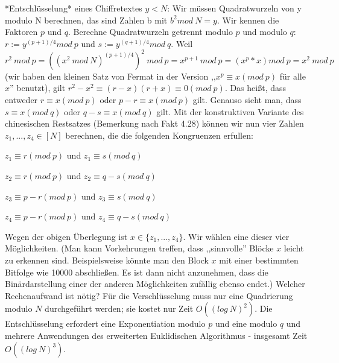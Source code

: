 \documentclass[a4paper]{article}
\begin{document}
\begin{multicols}{3}
        *Entschlüsselung* eines Chiffretextes $y<N$: Wir müssen Quadratwurzeln von y modulo N berechnen, das sind Zahlen b mit $b^2 mod\ N=y$. Wir kennen die Faktoren $p$ und $q$. Berechne Quadratwurzeln getrennt modulo $p$ und modulo $q$: $r:=y^{(p+1)/4} mod\ p$ und $s:=y^{(q+1)/4} mod\ q$.
        Weil $r^2\ mod\ p =((x^2\ mod\ N)^{(p+1)/4})^2\ mod\ p=x^{p+1}\ mod\ p=(x^p *x) mod\ p = x^2\ mod\ p$ (wir haben den kleinen Satz von Fermat in der Version ,,$x^p\equiv x(mod\ p)$ für alle $x$'' benutzt), gilt $r^2-x^2\equiv (r-x)(r+x)\equiv 0 (mod\ p)$. Das heißt, dass entweder $r\equiv x(mod\ p)$ oder $p-r\equiv x(mod\ p)$ gilt.
        Genauso sieht man, dass $s\equiv x(mod\ q)$ oder $q-s\equiv x(mod\ q)$ gilt.
        Mit der konstruktiven Variante des chinesischen Restsatzes (Bemerkung nach Fakt 4.28) können wir nun vier Zahlen $z_1,...,z_4 \in [N]$ berechnen, die die folgenden Kongruenzen erfullen:
        \begin{itemize*}
            \item $z_1 \equiv r (mod\ p)$ und $z_1 \equiv s (mod\ q)$
            \item $z_2 \equiv r (mod\ p)$ und $z_2 \equiv q-s (mod\ q)$
            \item $z_3 \equiv p-r (mod\ p)$ und $z_3 \equiv s (mod\ q)$
            \item $z_4 \equiv p-r (mod\ p)$ und $z_4 \equiv q-s (mod\ q)$
        \end{itemize*}

        Wegen der obigen Überlegung ist $x\in\{z_1,...,z_4\}$. Wir wählen eine dieser vier Möglichkeiten. (Man kann Vorkehrungen treffen, dass ,,sinnvolle'' Blöcke $x$ leicht zu erkennen sind. Beispielsweise könnte man den Block $x$ mit einer bestimmten Bitfolge wie 10000 abschließen. Es ist dann nicht anzunehmen, dass die Binärdarstellung einer der anderen Möglichkeiten zufällig ebenso endet.)
        Welcher Rechenaufwand ist nötig? Für die Verschlüsselung muss nur eine Quadrierung modulo $N$ durchgeführt werden; sie kostet nur Zeit $O((log\ N)^2)$. Die Entschlüsselung erfordert eine Exponentiation modulo $p$ und eine modulo $q$ und mehrere Anwendungen des erweiterten Euklidischen Algorithmus - insgesamt Zeit $O((log\ N)^3)$.


\end{multicols}
\end{document}
